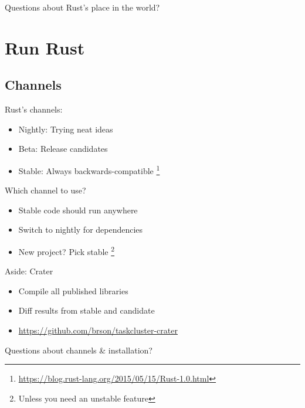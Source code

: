 \documentclass[100pt]{beamer}
\begin{document}
\begin{frame}
    Questions about Rust's place in the world?
\end{frame}

\section{Run Rust}

\subsection{Channels}

\begin{frame}
    Rust's channels:
    \begin{itemize}
        \item Nightly: Trying neat ideas
        \item Beta: Release candidates
        \item Stable: Always backwards-compatible \footnote{\url{https://blog.rust-lang.org/2015/05/15/Rust-1.0.html}}
    \end{itemize}
\end{frame}

\begin{frame}
    Which channel to use?
    \begin{itemize}
        \item Stable code should run anywhere
        \item Switch to nightly for dependencies
        \item New project? Pick stable \footnote{Unless you need an
              unstable feature}
    \end{itemize}
\end{frame}

\begin{frame}
    Aside: Crater
    \begin{itemize}
        \item Compile all published libraries
        \item Diff results from stable and candidate
        \item \url{https://github.com/brson/taskcluster-crater}
    \end{itemize}
\end{frame}

\begin{frame}
    Questions about channels \& installation?
\end{frame}
\end{document}
